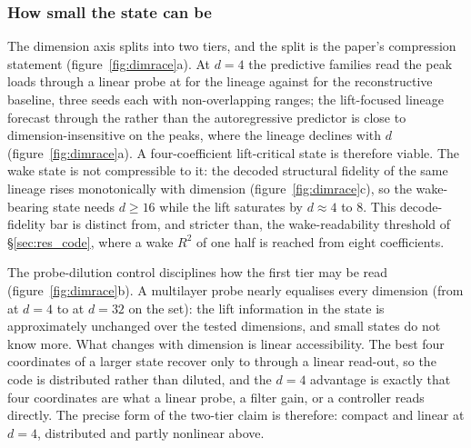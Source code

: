 
\subsubsection{How small the state can be}
\label{sec:res_dimension}

The dimension axis splits into two tiers, and the split is the paper's
compression statement (figure~\ref{fig:dimrace}a). At $d = 4$ the
predictive families read the peak loads through a linear probe at
\PoneLowdJepa{} for the \PredState{} lineage against \PoneLowdFukami{} for the
reconstructive baseline, three seeds each with non-overlapping ranges; the
lift-focused lineage forecast through the \DirectFC{} rather than the
autoregressive predictor is close to dimension-insensitive on the peaks, where
the \PredState{} lineage declines with $d$ (figure~\ref{fig:dimrace}a). A
four-coefficient lift-critical state is therefore viable. The wake state is not
compressible to it: the decoded structural fidelity of the same lineage rises
monotonically with dimension (figure~\ref{fig:dimrace}c), so the wake-bearing
state needs $d \geq 16$ while the lift saturates by $d \approx 4$ to $8$. This
decode-fidelity bar is distinct from, and stricter than, the wake-readability
threshold of \S\ref{sec:res_code}, where a wake $R^2$ of one half is reached
from eight coefficients.\re

The probe-dilution control disciplines how the first tier may be read
(figure~\ref{fig:dimrace}b). A multilayer probe nearly equalises every
dimension (from \PdMlpDFour{} at $d = 4$ to \PdMlpDThirtyTwo{} at
$d = 32$ on the \TestSplit{} set): the lift information in the state is
approximately unchanged over the tested dimensions, and small states do not
know more. What changes with
dimension is linear accessibility. The best four coordinates of a larger
state recover only \PdBestFourDEight{} to \PdBestFourDThirtyTwo{} through
a linear read-out, so the code is distributed rather than diluted, and the
$d = 4$ advantage is exactly that four coordinates are what a linear
probe, a filter gain, or a controller reads directly. The precise form of
the two-tier claim is therefore: compact and linear at $d = 4$,
distributed and partly nonlinear above.\re


